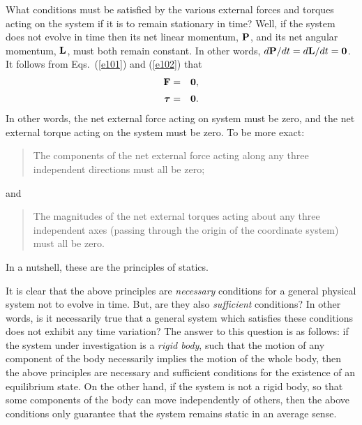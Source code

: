 What conditions must be satisfied by the various external forces and torques acting
on the system if it  is to remain stationary in time? Well,
if the system does not evolve in time then its net linear momentum, ${\bf P}$,
and its net angular momentum, ${\bf L}$, must both remain constant. 
In other words, $d{\bf P} /dt = d{\bf L}/dt = {\bf 0}$. 
It
follows from Eqs.~(\ref{e101}) and (\ref{e102}) that
\begin{eqnarray}
{\bf F} &=& {\bf 0},\\[0.5ex]
\mbox{\boldmath$\tau$} &=& {\bf 0}.
\end{eqnarray}
In other words, the net external force acting on system must be zero, and the
net external torque acting on the system must be zero. To be more exact:
\begin{quote}
{\sf The components of the net external force acting along any three independent directions
must all be zero};
\end{quote}
 and 
\begin{quote}
{\sf The magnitudes of the net external torques acting about any three independent axes
(passing through the origin of the coordinate system) must all be zero}. 
\end{quote}
In a nutshell,
these are the principles of statics.

It is clear that the above principles are {\em necessary} conditions for a general physical
system not to evolve in time. But, are they also {\em sufficient} conditions? In other
words, is it necessarily true that a general system which satisfies these conditions does not
exhibit any time variation? The answer to this question is as follows: if the
system under investigation is a {\em rigid body}, such that the motion of any
component of the body necessarily implies the motion of the whole body, then the
above principles are necessary and sufficient conditions for the existence of an equilibrium
state. On the other hand, if the system is not a rigid body, so
that some components of the body can move independently of others, then
the above conditions only guarantee that the system remains static in an average
sense.

